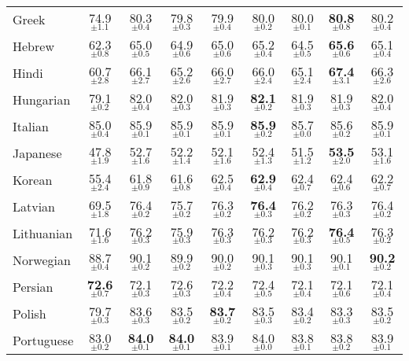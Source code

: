 \begin{table*}[ht]
{{\begin{tabular}{lcccccccc}
Greek & 74.9$_{\pm 1.1}$ & 80.3$_{\pm 0.4}$ & 79.8$_{\pm 0.3}$ & 79.9$_{\pm 0.4}$ & 80.0$_{\pm 0.2}$ & 80.0$_{\pm 0.1}$ & \textbf{80.8}$_{\pm 0.8}$ & 80.2$_{\pm 0.4}$ \\
Hebrew & 62.3$_{\pm 0.8}$ & 65.0$_{\pm 0.5}$ & 64.9$_{\pm 0.6}$ & 65.0$_{\pm 0.6}$ & 65.2$_{\pm 0.4}$ & 64.5$_{\pm 0.5}$ & \textbf{65.6}$_{\pm 0.6}$ & 65.1$_{\pm 0.4}$ \\
Hindi & 60.7$_{\pm 2.8}$ & 66.1$_{\pm 2.7}$ & 65.2$_{\pm 2.6}$ & 66.0$_{\pm 2.7}$ & 66.0$_{\pm 2.4}$ & 65.1$_{\pm 2.4}$ & \textbf{67.4}$_{\pm 3.1}$ & 66.3$_{\pm 2.6}$ \\
Hungarian & 79.1$_{\pm 0.2}$ & 82.0$_{\pm 0.4}$ & 82.0$_{\pm 0.3}$ & 81.9$_{\pm 0.3}$ & \textbf{82.1}$_{\pm 0.2}$ & 81.9$_{\pm 0.3}$ & 81.9$_{\pm 0.3}$ & 82.0$_{\pm 0.4}$ \\
Italian & 85.0$_{\pm 0.4}$ & 85.9$_{\pm 0.1}$ & 85.9$_{\pm 0.1}$ & 85.9$_{\pm 0.1}$ & \textbf{85.9}$_{\pm 0.2}$ & 85.7$_{\pm 0.0}$ & 85.6$_{\pm 0.2}$ & 85.9$_{\pm 0.1}$ \\
Japanese & 47.8$_{\pm 1.9}$ & 52.7$_{\pm 1.6}$ & 52.2$_{\pm 1.4}$ & 52.1$_{\pm 1.6}$ & 52.4$_{\pm 1.3}$ & 51.5$_{\pm 1.2}$ & \textbf{53.5}$_{\pm 2.0}$ & 53.1$_{\pm 1.6}$ \\
Korean & 55.4$_{\pm 2.4}$ & 61.8$_{\pm 0.9}$ & 61.6$_{\pm 0.8}$ & 62.5$_{\pm 0.4}$ & \textbf{62.9}$_{\pm 0.4}$ & 62.4$_{\pm 0.7}$ & 62.4$_{\pm 0.6}$ & 62.2$_{\pm 0.7}$ \\
Latvian & 69.5$_{\pm 1.8}$ & 76.4$_{\pm 0.2}$ & 75.7$_{\pm 0.2}$ & 76.3$_{\pm 0.2}$ & \textbf{76.4}$_{\pm 0.3}$ & 76.2$_{\pm 0.2}$ & 76.3$_{\pm 0.3}$ & 76.4$_{\pm 0.2}$ \\
Lithuanian & 71.6$_{\pm 1.6}$ & 76.2$_{\pm 0.3}$ & 75.9$_{\pm 0.3}$ & 76.3$_{\pm 0.3}$ & 76.2$_{\pm 0.3}$ & 76.2$_{\pm 0.3}$ & \textbf{76.4}$_{\pm 0.5}$ & 76.3$_{\pm 0.2}$ \\
Norwegian & 88.7$_{\pm 0.4}$ & 90.1$_{\pm 0.2}$ & 89.9$_{\pm 0.2}$ & 90.0$_{\pm 0.2}$ & 90.1$_{\pm 0.3}$ & 90.1$_{\pm 0.3}$ & 90.1$_{\pm 0.1}$ & \textbf{90.2}$_{\pm 0.2}$ \\
Persian & \textbf{72.6}$_{\pm 0.7}$ & 72.1$_{\pm 0.3}$ & 72.6$_{\pm 0.3}$ & 72.2$_{\pm 0.4}$ & 72.4$_{\pm 0.5}$ & 72.1$_{\pm 0.4}$ & 72.1$_{\pm 0.6}$ & 72.1$_{\pm 0.4}$ \\
Polish & 79.7$_{\pm 0.3}$ & 83.6$_{\pm 0.3}$ & 83.5$_{\pm 0.2}$ & \textbf{83.7}$_{\pm 0.2}$ & 83.5$_{\pm 0.3}$ & 83.4$_{\pm 0.2}$ & 83.3$_{\pm 0.3}$ & 83.5$_{\pm 0.2}$ \\
Portuguese & 83.0$_{\pm 0.2}$ & \textbf{84.0}$_{\pm 0.1}$ & \textbf{84.0}$_{\pm 0.1}$ & 83.9$_{\pm 0.1}$ & 84.0$_{\pm 0.0}$ & 83.8$_{\pm 0.1}$ & 83.8$_{\pm 0.2}$ & 83.9$_{\pm 0.1}$ \\

\end{tabular}}}
\end{table*}
